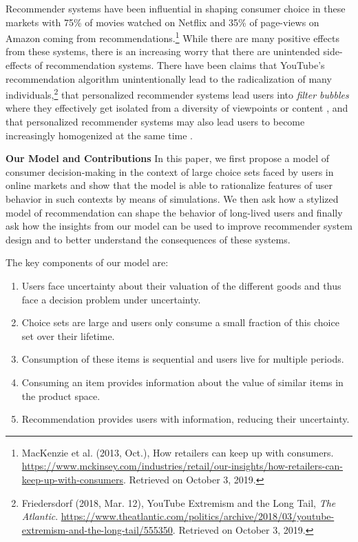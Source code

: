 \documentclass[sigconf]{acmart}
\begin{document}
Recommender systems have been influential in shaping consumer choice in these markets with 75\% of movies watched on Netflix and 35\% of page-views on Amazon coming from recommendations.\footnote{MacKenzie et al. (2013, Oct.),  How retailers can keep up with consumers. \url{https://www.mckinsey.com/industries/retail/our-insights/how-retailers-can-keep-up-with-consumers}. Retrieved on October 3, 2019.} While there are many positive effects from these systems, there is an increasing worry that there are unintended side-effects of recommendation systems. There have been claims that YouTube's recommendation algorithm unintentionally lead to the radicalization of many individuals,\footnote{Friedersdorf (2018, Mar. 12), YouTube Extremism and the Long Tail, \textit{The Atlantic}. \url{https://www.theatlantic.com/politics/archive/2018/03/youtube-extremism-and-the-long-tail/555350}. Retrieved on October 3, 2019.} that personalized recommender systems lead users into \textit{filter bubbles} where they effectively get isolated from a diversity of viewpoints or content \cite{pariser2011filter}, and that personalized recommender systems may also lead users to become increasingly homogenized at the same time \cite{chaney2018algorithmic, hosanagar2013will}.
\par

\noindent \textbf{Our Model and Contributions} In this paper, 
we first propose a model of consumer decision-making in the context of large choice sets faced by users in online markets and show that the model is able to rationalize features of user behavior in such contexts by means of simulations. 
We then ask how a stylized model of recommendation can shape the behavior of long-lived users
and finally ask how the insights from our model can be used to improve recommender system design and to better understand the consequences of these systems.
\par

The key components of our model are:
\begin{enumerate}[label=(\arabic*)]
\item Users face uncertainty about their valuation of the different goods and thus face a decision problem under uncertainty.
\item Choice sets are large and users only consume a small fraction of this choice set over their lifetime.
\item Consumption of these items is sequential and users live for multiple periods.
\item Consuming an item provides information about the value of similar items in the product space.
\item Recommendation provides users with information, reducing their uncertainty.
\end{enumerate}
\end{document}
